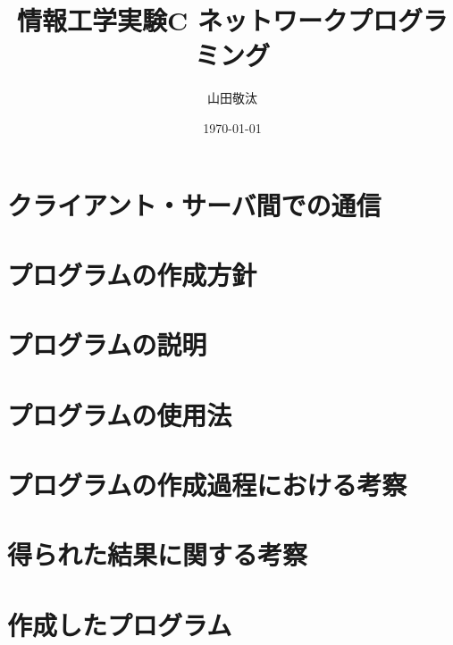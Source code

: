 \documentclass[11pt]{jsarticle}
\begin{document}
\title{情報工学実験C ネットワークプログラミング}
\author{山田敬汰}
\date{\today}
\maketitle

\section{クライアント・サーバ間での通信}
\section{プログラムの作成方針}
\section{プログラムの説明}
\section{プログラムの使用法}
\section{プログラムの作成過程における考察}
\section{得られた結果に関する考察}
\section{作成したプログラム}
\end{document}
